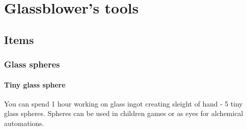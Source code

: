 \chapter{Glassblower's tools}

\section{Items}

\subsection{Glass spheres}

\subsubsection{Tiny glass sphere}

You can spend 1 hour working on glass ingot creating sleight of hand - 5 tiny glass spheres. Spheres can be used in children games or as eyes for alchemical automations.
